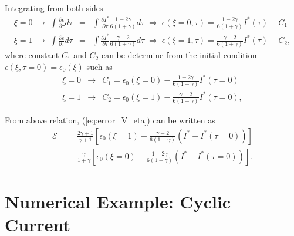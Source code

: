 \documentclass[]{article}
\begin{document}
Integrating from both sides
\begin{eqnarray}
\xi = 0 \;\rightarrow\; \int\frac{\partial\epsilon}{\partial\tau} d\tau & = & \int \frac{\partial I^*}{\partial\tau} \frac{1-2\gamma}{6(1+\gamma)}d\tau \;\Rightarrow\; \epsilon(\xi=0,\tau)=\frac{1-2\gamma}{6(1+\gamma)} I^*(\tau) +C_1\\
\xi = 1 \; \rightarrow\;\int\frac{\partial\epsilon}{\partial\tau} d\tau & = & \int \frac{\partial I^*}{\partial\tau} \frac{\gamma-2}{6(1+\gamma)}d\tau  \;\Rightarrow\; \epsilon(\xi=1,\tau)=\frac{\gamma-2}{6(1+\gamma)} I^*(\tau) +C_2, \nonumber
\end{eqnarray}
%
where constant $C_1$ and $C_2$ can be determine from the initial condition $\epsilon(\xi,\tau=0)=\epsilon_0(\xi)$ such as
%
\begin{eqnarray}
\xi = 0 &\rightarrow& C_1 = \epsilon_0(\xi=0) - \frac{1-2\gamma}{6(1+\gamma)} I^*(\tau=0)\\
\xi = 1 &\rightarrow& C_2 = \epsilon_0(\xi=1) - \frac{\gamma-2}{6(1+\gamma)}  I^*(\tau=0), \nonumber
\end{eqnarray}

From above relation, (\ref{eq:error_V_eta}) can be written as
%
\begin{eqnarray}\label{eq:error_estimate_Velectrod}
\mathcal{E} &=& \frac{2\gamma+1}{\gamma+1}\left[\epsilon_0(\xi=1) + \frac{\gamma-2}{6(1+\gamma)}(I^* - I^*(\tau=0))  \right]\\
&-& \frac{\gamma}{1+\gamma}\left[\epsilon_0(\xi=0) + \frac{1-2\gamma}{6(1+\gamma)}(I^* - I^*(\tau=0)) \right]. \nonumber
\end{eqnarray}



\section{Numerical Example: Cyclic Current }
\end{document}
